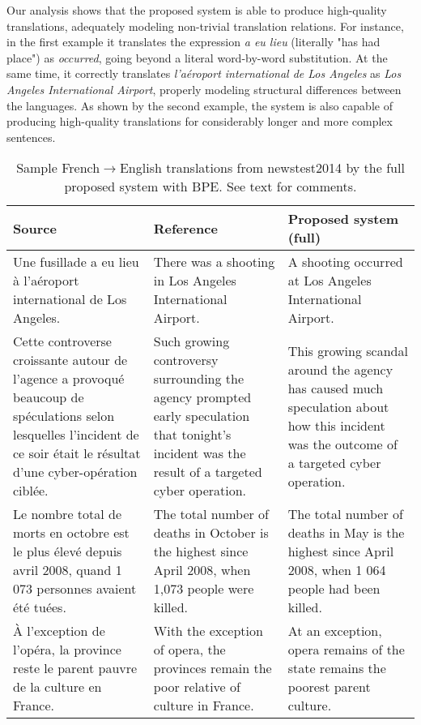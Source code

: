 \documentclass{article} \usepackage{iclr2018_conference,times}
\begin{document}
Our analysis shows that the proposed system is able to produce high-quality translations, adequately modeling non-trivial translation relations. For instance, in the first example it translates the expression \textit{a eu lieu} (literally "has had place") as \textit{occurred}, going beyond a literal word-by-word substitution. At the same time, it correctly translates \textit{l'aéroport international de Los Angeles} as \textit{Los Angeles International Airport}, properly modeling structural differences between the languages. As shown by the second example, the system is also capable of producing high-quality translations for considerably longer and more complex sentences.

\begin{table*}[t]
\caption{Sample French$\rightarrow$English translations from newstest2014 by the full proposed system with BPE. See text for comments.} \label{tab:examples}
\begin{small}
\begin{center}
  \begin{tabular}{p{4.1cm}p{4.1cm}p{4.1cm}}
    \toprule
    \bf Source & \bf Reference & \bf Proposed system (full) \\
    \midrule
    Une fusillade a eu lieu à l'aéroport international de Los Angeles. & There was a shooting in Los Angeles International Airport. & A shooting occurred at Los Angeles International Airport.\\
    \midrule
    Cette controverse croissante autour de l'agence a provoqué beaucoup de spéculations selon lesquelles l'incident de ce soir était le résultat d'une cyber-opération ciblée. & Such growing controversy surrounding the agency prompted early speculation that tonight's incident was the result of a targeted cyber operation. & This growing scandal around the agency has caused much speculation about how this incident was the outcome of a targeted cyber operation. \\
    \midrule
    Le nombre total de morts en octobre est le plus élevé depuis avril 2008, quand 1 073 personnes avaient été tuées. & The total number of deaths in October is the highest since April 2008, when 1,073 people were killed. & The total number of deaths in May is the highest since April 2008, when 1 064 people had been killed. \\
    \midrule
    À l'exception de l'opéra, la province reste le parent pauvre de la culture en France. & With the exception of opera, the provinces remain the poor relative of culture in France. & At an exception, opera remains of the state remains the poorest parent culture. \\
    \bottomrule
  \end{tabular}
\end{center}
\end{small}
\end{table*}
\end{document}
